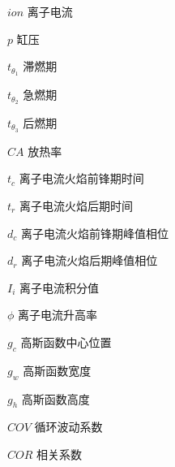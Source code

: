 \begin{denotation}
\item[$ion$] 离子电流
\item[$p$] 缸压
\item[$t_{\theta_1}$] 滞燃期
\item[$t_{\theta_2}$] 急燃期
\item[$t_{\theta_3}$] 后燃期
\item[$CA$] 放热率
\item[$t_c$] 离子电流火焰前锋期时间
\item[$t_r$] 离子电流火焰后期时间
\item[$d_c$] 离子电流火焰前锋期峰值相位
\item[$d_r$] 离子电流火焰后期峰值相位
\item[$I_i$] 离子电流积分值
\item[$\phi$] 离子电流升高率
\item[$g_c$] 高斯函数中心位置
\item[$g_w$] 高斯函数宽度
\item[$g_h$] 高斯函数高度
\item[$COV$] 循环波动系数
\item[$COR$] 相关系数
\end{denotation}

